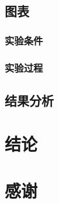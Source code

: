 \documentclass{ctexbook}%
\begin{document}
	 \subsection{图表}
	 \subsubsection{实验条件}
	 \subsubsection{实验过程}
	 \subsection{结果分析}
	 \section{结论}
	 \section{感谢}
	 	
	 	 
\end{document}
